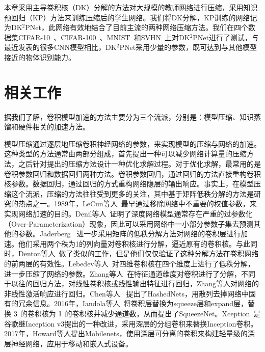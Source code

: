 本章采用主导卷积核（DK）分解的方法对大规模的教师网络进行压缩，采用知识预回归（KP）方法来训练压缩后的学生网络。我们将DK分解，KP训练的网络记为DK$^2$PNet，此网络有效地结合了目前主流的两种网络压缩方法。我们在四个数据集CIFAR-10~\cite{krizhevsky2009learning}、CIFAR-100~\cite{krizhevsky2009learning}、MNIST~\cite{lecun1998gradient}和SVHN~\cite{netzer2011reading}上对DK$^2$PNet进行了测试，与最近发表的很多CNN模型相比，DK$^2$PNet采用少量的参数，既可达到与其他模型接近的物体识别能力。

\section{相关工作}
\label{sec:acc:relate}

据我们了解，卷积模型加速的方法主要分为三个流派，分别是：模型压缩、知识蒸馏和硬件相关的加速方法。

模型压缩通过逐层地压缩卷积神经网络的参数，来实现模型的压缩与网络的加速。这种类型的方法通常由两部分组成，首先提出一种可以减少网络计算量的压缩方法，之后针对提出的压缩方法设计一种优化求解过程。对于优化求解，最常用的是卷积参数回归和数据回归两种方法。卷积参数回归，通过回归的方法直接重构卷积核参数。数据回归，通过回归的方式重构网络隐层的输出响应\cite{zhang2015efficient}。事实上，在模型压缩这个流派，压缩的方法往往受到更多的关注，其中基于矩阵低秩分解的方法是研究的热点之一。1989年，LeCun等人~\cite{lecun1989optimal}最早通过移除网络中不重要的权值参数，来实现网络加速的目的。Denil等人~\cite{denil2013predicting}证明了深度网络模型通常存在严重的过参数化（Over-Parameterization）现象，因此可以采用网络中一小部分参数子集去预测其他的参数。Jaderberg~\cite{jaderberg2014speeding} 进一步采用矩阵的低秩分解方法对网络的卷积层进行加速。他们采用两个秩为1的列向量对卷积核进行分解，逼近原有的卷积核。与此同时，Denton等人~\cite{denton2014exploiting}做了类似的工作，但是他们仅仅验证了这种分解方法在卷积网络的前两层的有效性。Lebedev等人~\cite{lebedev2014speeding}对四维卷积核在四个维度上进行了低秩分解，进一步压缩了网络的参数。Zhang等人~\cite{zhang2015efficient}在特征通道维度对卷积进行了分解，不同于以往的回归方法，对线性卷积核或线性输出特征进行回归，Zhang等人对网络的非线性激活响应进行回归。Chen等人~\cite{chen2015compressing} 提出了HashedNets，用散列去掉网络中固有的冗余信息。2016年，Iandola等人~\cite{iandola2016squeezenet}将卷积层替换为squeeze层和expand层，替换 $3\time3$ 的卷积核为 $1\time1$ 的卷积核并减少通道数，从而提出了SqueezeNet。Xception~\cite{chollet2016xception}是谷歌继Inception v3提出的一种改进，采用深层的分组卷积来替换Inception卷积。2017年，Howard等人\cite{howard2017mobilenets}提出Mobilenets，使用深层可分离的卷积来构建轻量级的深层神经网络，应用于移动和嵌入式设备。

